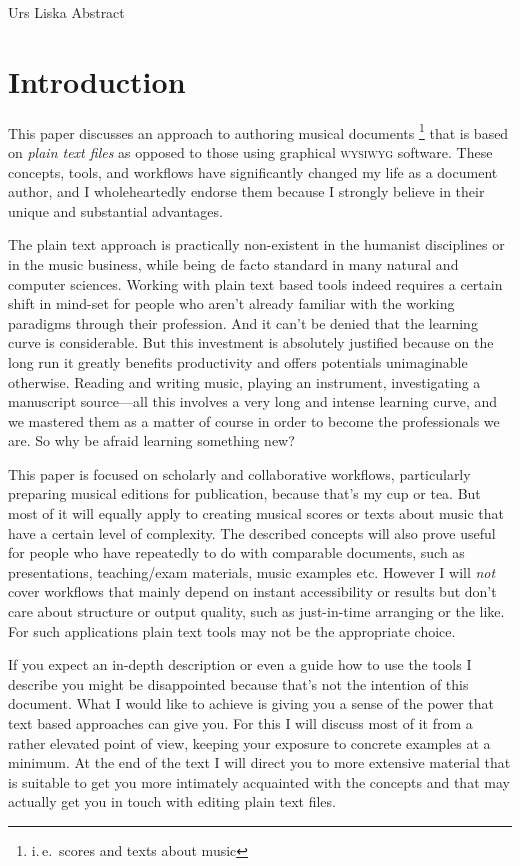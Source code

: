 \documentclass[../../LilyPond-Tutorials]{subfiles}
\begin{document}
\begin{authorAbstract}{Urs Liska}
Abstract
\end{authorAbstract}

\chapter*{Introduction}
\label{chap:introduction}
This paper discusses an approach to authoring musical documents%
\footnote{i.\,e.\ scores and texts about music}
that is based on \emph{plain text files} as opposed to those using graphical \textsc{wysiwyg} software.
These concepts, tools, and workflows have significantly changed my life as a document author, and I  wholeheartedly endorse them because I strongly believe in their unique and substantial advantages.

The plain text approach is practically non-existent in the humanist disciplines or in the music business, while being de facto standard in many natural and computer sciences.
Working with plain text based tools indeed requires a certain shift in mind-set for people who aren't already familiar with the working paradigms through their profession.
And it can't be denied that the learning curve is considerable.
But this investment is absolutely justified because on the long run it greatly benefits productivity and offers potentials unimaginable otherwise.
Reading and writing music, playing an instrument, investigating a manuscript source---all this involves a very long and intense learning curve, and we mastered them as a matter of course in order to become the professionals we are.
So why be afraid learning something new?

This paper is focused on scholarly and collaborative workflows, particularly preparing musical editions for publication, because that's my cup or tea.
But most of it will equally apply to creating musical scores or texts about music that have a certain level of complexity.
The described concepts will also prove useful for people who have repeatedly to do with comparable documents, such as presentations, teaching/exam materials, music examples etc.
However I will \emph{not} cover workflows that mainly depend on instant accessibility or results but don't care about structure or output quality, such as just-in-time arranging or the like.
For such applications plain text tools may not be the appropriate choice.

If you expect an in-depth description or even a guide how to use the tools I describe you might be disappointed because that's not the intention of this document.
What I would like to achieve is giving you a sense of the power that text based approaches can give you.
For this I will discuss most of it from a rather elevated point of view, keeping your exposure to concrete examples at a minimum.
At the end of the text I will direct you to more extensive material that is suitable to get you more intimately acquainted with the concepts and that may actually get you in touch with editing plain text files.
\end{document}

